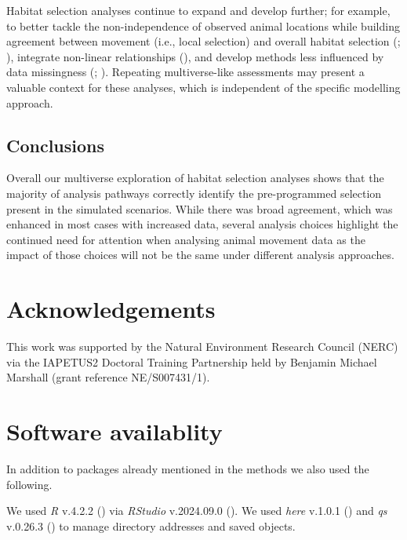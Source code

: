 \documentclass[10pt,a4paper]{article}
\begin{document}
Habitat selection analyses continue to expand and develop further; for example, to better tackle the non-independence of observed animal locations while building agreement between movement (i.e., local selection) and overall habitat selection (; ), integrate non-linear relationships (), and develop methods less influenced by data missingness (; ).
Repeating multiverse-like assessments may present a valuable context for these analyses, which is independent of the specific modelling approach.

\subsection{Conclusions}\label{conclusions}

Overall our multiverse exploration of habitat selection analyses shows that the majority of analysis pathways correctly identify the pre-programmed selection present in the simulated scenarios.
While there was broad agreement, which was enhanced in most cases with increased data, several analysis choices highlight the continued need for attention when analysing animal movement data as the impact of those choices will not be the same under different analysis approaches.

\section{Acknowledgements}\label{acknowledgements}

This work was supported by the Natural Environment Research Council (NERC) via the IAPETUS2 Doctoral Training Partnership held by Benjamin Michael Marshall (grant reference NE/S007431/1).

\section{Software availablity}\label{software-availablity}

In addition to packages already mentioned in the methods we also used the following.

We used \emph{R} v.4.2.2 () via \emph{RStudio} v.2024.09.0 ().
We used \emph{here} v.1.0.1 () and \emph{qs} v.0.26.3 () to manage directory addresses and saved objects.
\end{document}
